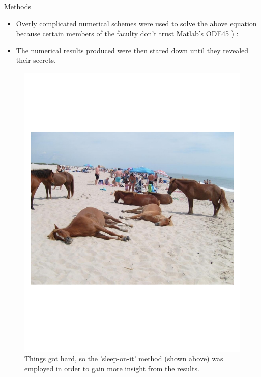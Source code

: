 \documentclass[final]{beamer}
\begin{document}
\begin{frame}[plain]{}
\begin{center}
\begin{minipage}[t]{.23\linewidth}
\begin{block}{\Large Methods}
	\begin{itemize}
	\item Overly complicated numerical schemes were used to solve the above equation because certain members of the faculty don't trust Matlab's ODE45 ) :
	\item The numerical results produced were then stared down until they revealed their secrets.
	\end{itemize}
	
	  \begin{figure} \def\figurename{Fig.}
	    \centering
	    \includegraphics[width=.9\textwidth,trim = 0cm 5cm 0cm 5.5cm, clip]{./figs/seahorse}
	    \caption{\normalsize Things got hard, so the 'sleep-on-it' method (shown above) was employed in order to gain more insight from the results.}
	    \label{fig:FigLabel1}
	  \end{figure}
		  
	\end{block} 

      \end{minipage}\hspace{1.25cm}%
%
%
%
      \begin{minipage}[t]{.23\linewidth}


\end{minipage}
\end{center}
\end{frame}
\end{document}

